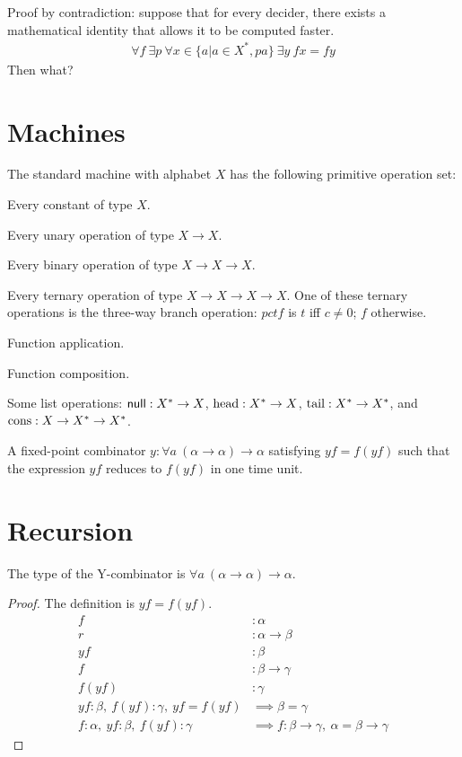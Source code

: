 Proof by contradiction:
suppose that for every decider,
there exists a mathematical identity that allows it to be computed faster.
\begin{align}
    \forall f ~ \exists p ~ \forall x \in \{ a | a \in X^*, p a \} ~ \exists y ~ fx = fy
\end{align}
Then what?

\section{Machines}

\begin{mdef}
    The standard machine with alphabet $X$
    has the following primitive operation set:

    Every constant of type $X$.

    Every unary operation of type $X \to X$.

    Every binary operation of type $X \to X \to X$.

    Every ternary operation of type $X \to X \to X \to X$.
    One of these ternary operations is the three-way branch operation:
    $pctf$ is $t$ iff $c \neq 0$; $f$ otherwise.

    Function application.

    Function composition.

    Some list operations: $\textsf{null} : X^* \to X$,
    $\operatorname{head} : X^* \to X$,
    $\operatorname{tail} : X^* \to X^*$,
    and $\operatorname{cons} : X \to X^* \to X^*$.

    A fixed-point combinator $y : \forall a ~ (\alpha \to \alpha) \to \alpha$ satisfying $yf = f(yf)$
    such that the expression $yf$ reduces to $f(yf)$ in one time unit.
\end{mdef}

\section{Recursion}

\begin{mlem}
    The type of the Y-combinator is $\forall a ~ (\alpha \to \alpha) \to \alpha$.
    \begin{proof}
        The definition is $yf = f(yf)$.
        \begin{align}
            f &: \alpha
            \\
            r &: \alpha \to \beta
            \\
            yf &: \beta
            \\
            f &: \beta \to \gamma
            \\
            f(yf) &: \gamma
            \\
            yf : \beta, \ f(yf) : \gamma, \ yf = f(yf) &\implies \beta = \gamma
            \\
            f : \alpha, \ yf : \beta, \ f(yf) : \gamma &\implies f : \beta \to \gamma, \ \alpha = \beta \to \gamma
        \end{align}
    \end{proof}
\end{mlem}

